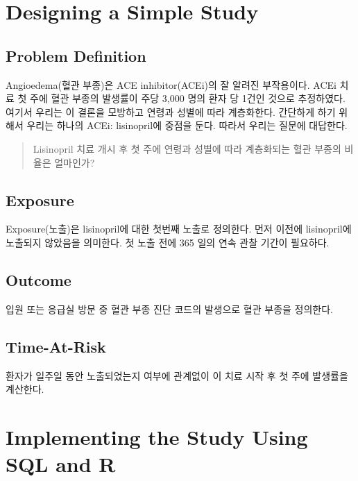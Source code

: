\documentclass[11pt]{book}
\theoremstyle{definition}
\theoremstyle{definition}
\theoremstyle{definition}
\theoremstyle{remark}
\begin{document}
\section{Designing a Simple Study}\label{designing-a-simple-study}

\subsection{Problem Definition}\label{problem-definition}

Angioedema(혈관 부종)은 ACE inhibitor(ACEi)의 잘 알려진 부작용이다.
\citep{slater_1988} ACEi 치료 첫 주에 혈관 부종의 발생률이 주당 3,000
명의 환자 당 1건인 것으로 추정하였다. 여기서 우리는 이 결론을 모방하고
연령과 성별에 따라 계층화한다. 간단하게 하기 위해서 우리는 하나의 ACEi:
lisinopril에 중점을 둔다. 따라서 우리는 질문에 대답한다.

\begin{quote}
Lisinopril 치료 개시 후 첫 주에 연령과 성별에 따라 계층화되는 혈관
부종의 비율은 얼마인가?
\end{quote}

\subsection{Exposure}\label{exposure}

Exposure(노출)은 lisinopril에 대한 첫번째 노출로 정의한다. 먼저 이전에
lisinopril에 노출되지 않았음을 의미한다. 첫 노출 전에 365 일의 연속 관찰
기간이 필요하다.

\subsection{Outcome}\label{outcome}

입원 또는 응급실 방문 중 혈관 부종 진단 코드의 발생으로 혈관 부종을
정의한다.

\subsection{Time-At-Risk}\label{time-at-risk}

환자가 일주일 동안 노출되었는지 여부에 관계없이 이 치료 시작 후 첫 주에
발생률을 계산한다.

\section{Implementing the Study Using SQL and
R}\label{implementing-the-study-using-sql-and-r}
\end{document}

